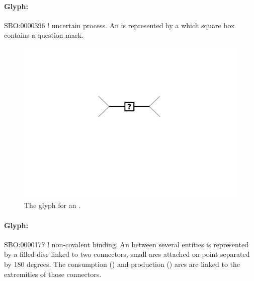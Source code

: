 
\paragraph{Glyph: }\label{sec:uncertain}

\begin{glyphDescription}
 \glyphSboTerm SBO:0000396 ! uncertain process.
 \glyphNode An  is represented by a  which square box contains a question mark.
 \end{glyphDescription}

\begin{figure}[H]
  \centering
  \includegraphics[scale = 0.5]{images/uncertain}
  \caption{The \PD glyph for an .}
  \label{fig:uncertain}
\end{figure}



\paragraph{Glyph: }\label{sec:association}


\begin{glyphDescription}
 \glyphSboTerm SBO:0000177 ! non-covalent binding.
 \glyphNode An  between several entities is represented by a filled disc linked to two connectors, small arcs attached on point separated by 180 degrees. The consumption () and production () arcs are linked to the extremities of those connectors. 
 \end{glyphDescription}

